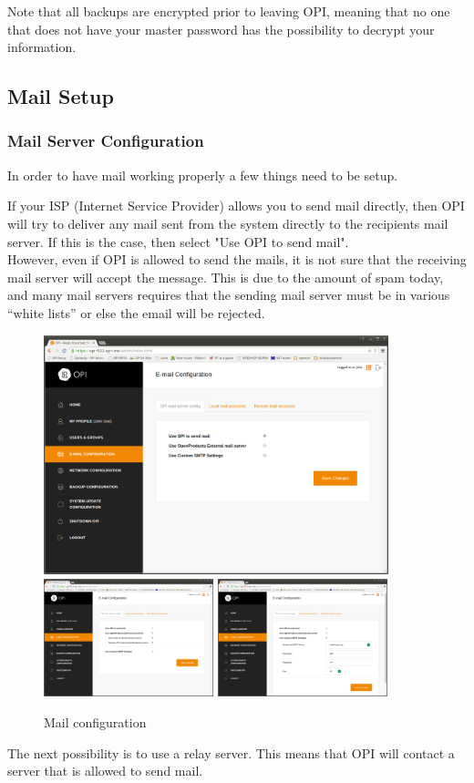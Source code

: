 \documentclass[12pt,a4paper,titlepage]{article}
\begin{document}
Note that all backups are encrypted prior to leaving OPI, meaning that no one that does not have your master password has the possibility to decrypt your information.

\subsection{Mail Setup}
\subsubsection{Mail Server Configuration}
In order to have mail working properly a few things need to be setup.

If your ISP (Internet Service Provider) allows you to send mail directly, then OPI will try to deliver any mail sent from the system directly to the recipients mail server. If this is the case, then select "Use OPI to send mail".\\
However, even if OPI is allowed to send the mails, it is not sure that the receiving mail server will accept the message. This is due to the amount of spam today, and many mail servers requires that the sending mail server must be in various ``white lists'' or else the email will be rejected.

\begin{figure}[h!]
\centering
\includegraphics[width=10cm]{./img/smtp_config}
\includegraphics[width=4.93cm]{./img/smtp_config-2}
\includegraphics[width=4.93cm]{./img/smtp_config-3}
\caption{Mail configuration}
\end{figure}
The next possibility is to use a relay server. This means that OPI will contact a server that is allowed to send mail.
\end{document}

